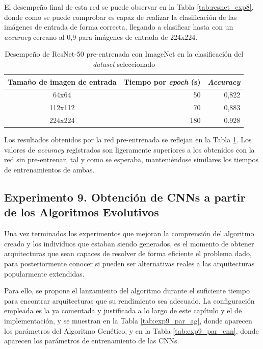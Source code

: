 El desempeño final de esta red se puede observar en la Tabla \ref{tab:resnet_exp8}, donde como se puede comprobar es capaz de realizar la clasificación de las imágenes de entrada de forma correcta, llegando a clasificar hasta con un \textit{accuracy} cercano al 0,9 para imágenes de entrada de 224x224.

\begin{table}[h]
\caption{Desempeño de ResNet-50 pre-entrenada con ImageNet en la clasificación del \textit{dataset} seleccionado}
\label{tab:resnet_imagenet_exp8}
\centering
\begin{tabular}{c|r|r}
\toprule
\multicolumn{1}{c|}{\textbf{Tamaño de imagen de entrada}} & \multicolumn{1}{c|}{\textbf{Tiempo por \textit{epoch} (s)}} & \multicolumn{1}{c}{\textit{\textbf{Accuracy}}} \\ \hline
64x64                                                     & 50    & 0,822 \\
112x112                                                   & 70    & 0,883 \\
224x224                                                   & 180   & 0.928 \\
\bottomrule
\end{tabular}
\end{table}

Los resultados obtenidos por la red pre-entrenada se reflejan en la Tabla \ref{tab:resnet_imagenet_exp8}. Los valores de \textit{accuracy} registrados son ligeramente superiores a los obtenidos con la red sin pre-entrenar, tal y como se esperaba, manteniéndose similares los tiempos de entrenamientos de ambas.


\subsection{Experimento 9. Obtención de CNNs a partir de los Algoritmos Evolutivos}

Una vez terminados los experimentos que mejoran la comprensión del algoritmo creado y los individuos que estaban siendo generados, es el momento de obtener arquitecturas que sean capaces de resolver de forma eficiente el problema dado, para posteriormente conocer si pueden ser alternativas reales a las arquitecturas popularmente extendidas.

Para ello, se propone el lanzamiento del algoritmo durante el suficiente tiempo para encontrar arquitecturas que su rendimiento sea adecuado. La configuración empleada es la ya comentada y justificada a lo largo de este capítulo y el de implementación, y se muestran en la Tabla \ref{tab:exp9_par_ag}, donde aparecen los parámetros del Algoritmo Genético, y en la Tabla \ref{tab:exp9_par_cnn}, donde aparecen los parámetros de entrenamiento de las CNNs.\\

